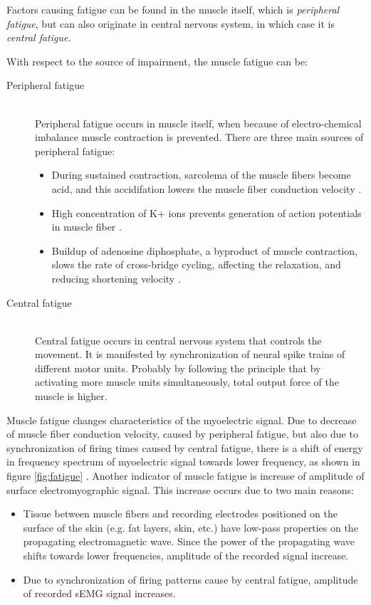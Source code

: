 Factors causing fatigue can be found in the muscle itself, which is \emph{peripheral fatigue}, but can also originate in central nervous system, in which case it is \emph{central fatigue}.

With respect to the source of impairment, the muscle fatigue can be:

\begin{description}

\item[Peripheral fatigue] \hfill \\
	Peripheral fatigue occurs in muscle itself, when because of electro-chemical imbalance muscle contraction is prevented. There are three main sources of peripheral fatigue:
	\begin{itemize}
		\item During sustained contraction, sarcolema of the muscle fibers become acid, and this accidifation lowers the muscle fiber conduction velocity \citep{DeLuca1984}.
		
		\item High concentration of K+ ions prevents generation of action potentials in muscle fiber \citep{Widmaier2014}. 
		
		\item Buildup of adenosine diphosphate, a byproduct of muscle contraction, slows the rate of cross-bridge cycling, affecting the relaxation, and reducing shortening velocity \citep{Widmaier2014}.
	\end{itemize}

\item[Central fatigue] \hfill \\
	Central fatigue occurs in central nervous system that controls the movement. It is manifested by synchronization of neural spike trains of different motor units. Probably by following the principle that by activating more muscle units simultaneously, total output force of the muscle is higher. 

\end{description}

Muscle fatigue changes characteristics of the myoelectric signal. Due to decrease of muscle fiber conduction velocity, caused by peripheral fatigue, but also due to synchronization of firing times caused by central fatigue, there is a shift of energy in frequency spectrum of myoelectric signal towards lower frequency, as shown in figure \ref{fig:fatigue} \citep{DeLuca1984}. Another indicator of muscle fatigue is increase of amplitude of surface electromyographic signal. This increase occurs due to two main reasons:
\begin{itemize}
\item Tissue between muscle fibers and recording electrodes positioned on the surface of the skin (e.g. fat layers, skin, etc.) have low-pass properties on the propagating electromagnetic wave. Since the power of the propagating wave shifts towards lower frequencies, amplitude of the recorded signal increase.

\item Due to synchronization of firing patterns cause by central fatigue, amplitude of recorded sEMG signal increases. 
\end{itemize} 

